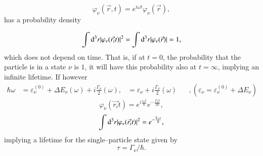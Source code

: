 \begin{equation}
\varphi_{\nu}(\vec{r},t) = e^{i\omega t} \varphi_{\nu}(\vec{r}) ,
\label{eqn:43}
\end{equation}
has a probability density

\begin{equation}
\int{\rm d}^3 r |\varphi_{\nu}(\vec{r_i}t)|^2 = \int{\rm d}^3 r |\varphi_{\nu}(\vec{r})| = 1 ,
\label{eqn:44}
\end{equation}
which does not depend on time. That is, if at $t=0$, the probability that the particle is in a state $\nu$ is $1$, it will have this probability also at $t=\infty$, implying an infinite lifetime. If however
\begin{eqnarray}
\nonumber
\hbar\omega &= \varepsilon_{\nu}^{(0)} + \Delta E_{\nu}(\omega) + i \frac{\Gamma_\nu}{2} (\omega),
\nonumber
&= \varepsilon_{\nu} + i \frac{\Gamma_{\nu}}{2}(\omega) \;\;\;\;\;\; , (\varepsilon_{\nu} = \varepsilon_{\nu}^{(0)} + \Delta E_{\nu})
\end{eqnarray}
\begin{equation}
\nonumber
\varphi_{\nu}(\vec{r_i} t) = e^{i \frac{\varepsilon_{\nu} t}{\hbar}} e^{- \frac{\Gamma_{\nu} t}{2\hbar}} ,
\end{equation}
\begin{equation}
\int{\rm d}^3 r |\varphi_{\nu} (\vec{r_i} t)|^2 = e^{- \frac{\Gamma_{\nu} t}{\hbar}} ,
\label{eqn:44b}
\end{equation}
implying a lifetime for the single--particle state given by
\begin{equation}
\tau = \Gamma_\nu/\hbar .
\label{eqn:45}
\end{equation}

